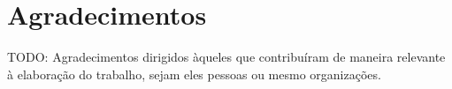 
\chapter*{Agradecimentos}

TODO: Agradecimentos dirigidos àqueles que contribuíram de maneira relevante à
elaboração do trabalho, sejam eles pessoas ou mesmo organizações.
